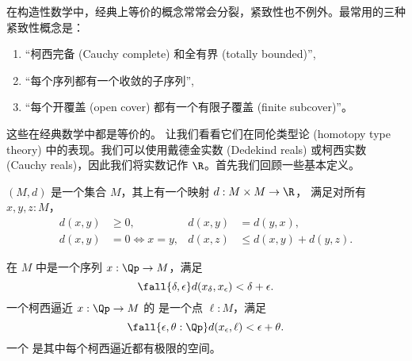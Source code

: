 在构造性数学中，经典上等价的概念常常会分裂，紧致性也不例外。最常用的三种紧致性概念是：
%
%
\begin{enumerate}
  \item {} “柯西完备 (Cauchy complete) 和全有界 (totally bounded)”,
  \item {} “每个序列都有一个收敛的子序列”,
  \item {} “每个开覆盖 (open cover) 都有一个有限子覆盖 (finite subcover)”。
\end{enumerate}
%
这些在经典数学中都是等价的。
让我们看看它们在同伦类型论 (homotopy type theory) 中的表现。我们可以使用戴德金实数 (Dedekind reals) 或柯西实数 (Cauchy reals)，因此我们将实数记作 $\R$。首先我们回顾一些基本定义。

%

\begin{defn} \label{defn:metric-space}
%
$(M, d)$ 是一个集合 $M$，其上有一个映射 $d : M \times M \to \R$，
满足对所有 $x, y, z : M$，
%
\begin{align*}
  d(x,y) &\geq 0, &
  d(x,y) &= d(y,x), \\
  d(x,y) &= 0 \Leftrightarrow x = y, &
  d(x,z) &\leq d(x,y) + d(y,z).
\end{align*}
\end{defn}

\begin{defn} \label{defn:complete-metric-space}
%
在 $M$ 中是一个序列 $x : \Qp \to M$，满足
%
\begin{equation*}
  \fall{\delta, \epsilon} d(x_\delta, x_\epsilon) < \delta + \epsilon.
\end{equation*}
%
%
一个柯西逼近 $x : \Qp \to M$ 的  是一个点 $\ell : M$，满足
%
\begin{equation*}
  \fall{\epsilon, \theta : \Qp} d(x_\epsilon, \ell) < \epsilon + \theta.
\end{equation*}
%
%
%
一个  是其中每个柯西逼近都有极限的空间。
\end{defn}

